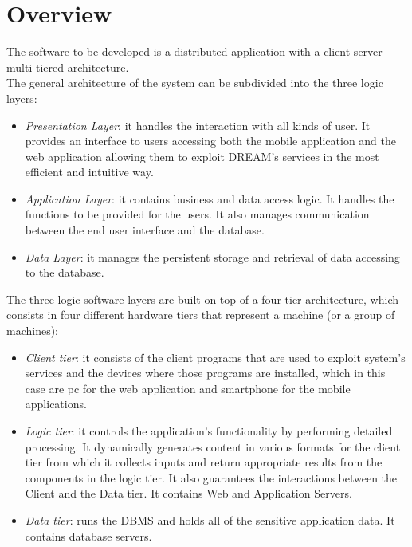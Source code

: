 \section{Overview}

The software to be developed is a distributed application with a client-server multi-tiered architecture. \\
The general architecture of the system can be subdivided into the three logic layers:
\begin{itemize}
    \item \textit{Presentation Layer}: it handles the interaction with all kinds of user. It provides an interface to users accessing both the mobile application and the web application allowing them to exploit DREAM’s services in the most efficient and intuitive way. 
    \item \textit{Application Layer}: it contains business and data access logic. It handles the functions to be provided for the users. It also manages communication between the end user interface and the database. 
    \item \textit{Data Layer}: it manages the persistent storage and retrieval of data accessing to the database. 
\end{itemize}

The three logic software layers are built on top of a four tier architecture, which consists in four different hardware tiers that represent a machine (or a group of machines):
\begin{itemize}
    \item \textit{Client tier}: it consists of the client programs that are used to exploit system’s services and the devices where those programs are installed, which in this case are pc for the web application and smartphone for the mobile applications.
    \item \textit{Logic tier}: it controls the application’s functionality by performing detailed processing. It dynamically generates content in various formats for the client tier from which it collects inputs and return appropriate results from the components in the logic tier.
    It also guarantees the interactions between the Client and the Data tier. It contains Web and Application Servers.
    
    \item \textit{Data tier}: runs the DBMS and holds all of the sensitive application data. It contains database servers.
\end{itemize}

